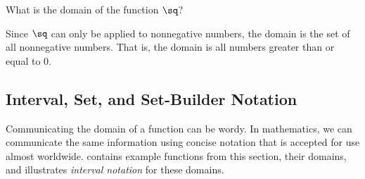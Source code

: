 \begin{doyouunderstand}
	\begin{problem}\label{fun:prob:sqrtdomain}
	What is the domain of the function $\sq$?
	\begin{shortsolution}
		Since $\sq$ can only be applied to nonnegative numbers, the domain is the set of all nonnegative numbers. That is, the domain is all numbers greater than or equal to \num{0}.
	\end{shortsolution}
	\end{problem}
\end{doyouunderstand}
\subsection{Interval, Set, and Set-Builder Notation}
Communicating the domain of a function can be wordy. In mathematics, we can communicate the same information using concise notation that is accepted for use almost worldwide.  contains example functions from this section, their domains, and illustrates \emph{interval notation} for these domains.
